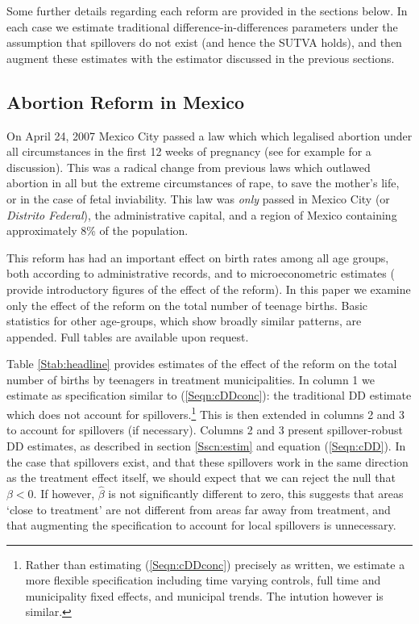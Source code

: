 \documentclass{article}
\begin{document}
\begin{spacing}{1.1}
Some further details regarding each reform are provided in the sections below.
In each case we estimate traditional difference-in-differences parameters under
the assumption that spillovers do not exist (and hence the SUTVA holds), and
then augment these estimates with the estimator discussed in the previous
sections.

\subsection{Abortion Reform in Mexico}
On April 24, 2007 Mexico City passed a law which which legalised abortion 
under all circumstances in the first 12 weeks of pregnancy (see for example
\citet{Fraser2014} for a discussion).  This was a radical change from previous 
laws which outlawed abortion in all but the extreme circumstances of rape, 
to save the mother's life, or in the case of fetal inviability.  This law was 
\emph{only} passed in Mexico City (or \emph{Distrito Federal}), the 
administrative capital, and a region of Mexico containing approximately 8\% 
of the population.

This reform has had an important effect on birth rates among all age groups,
both according to administrative records, and to microeconometric estimates
(\citet{ClarkeMuhlrad2014} provide introductory figures of the effect of the
reform).  In this paper we examine only the effect of the reform on the total
number of teenage births.  Basic statistics for other age-groups, which show 
broadly similar patterns, are appended.  Full tables are available upon 
request.

Table \ref{Stab:headline} provides estimates of the effect of the reform on
the total number of births by teenagers in treatment municipalities.  In 
column 1 we estimate as specification similar to (\ref{Seqn:cDDconc}): the 
traditional DD estimate which does not account for spillovers.\footnote{Rather 
than estimating (\ref{Seqn:cDDconc}) precisely as written, we estimate a more 
flexible specification including time varying controls, full time and
municipality fixed effects, and municipal trends.  The intution however is
similar.}  This is then extended in columns 2 and 3 to account for spillovers
(if necessary).  Columns 2 and 3 present spillover-robust DD estimates, as 
described in section \ref{Sscn:estim} and equation (\ref{Seqn:cDD}).  In the
case that spillovers exist, and that these spillovers work in the same 
direction as the treatment effect itself, we should expect that we can reject
the null that $\beta<0$.  If however, $\hat\beta$ is not significantly 
different to zero, this suggests that areas `close to treatment' are not
different from areas far away from treatment, and that augmenting the 
specification to account for local spillovers is unnecessary.


\end{spacing}
\end{document}
